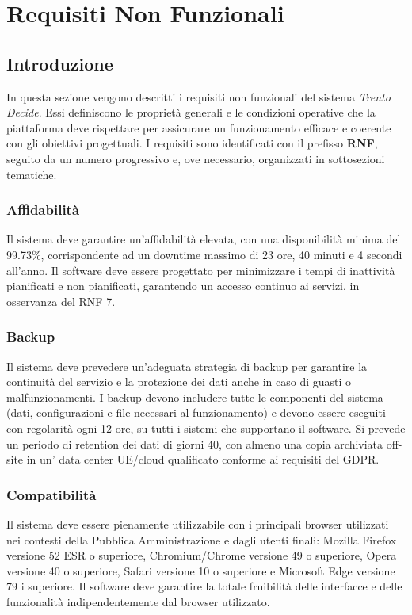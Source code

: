 \setcounter{secnumdepth}{3}

\chapter{Requisiti Non Funzionali}

\renewcommand{\thesubsection}{RNF\arabic{subsection}}
\renewcommand{\thesubsubsection}{RNF\arabic{subsection}.\arabic{subsubsection}}

\setlength{\parskip}{0.4em}
\setlength{\parindent}{0pt}

\section{Introduzione}
In questa sezione vengono descritti i requisiti non funzionali del sistema \textit{Trento Decide}.
Essi definiscono le proprietà generali e le condizioni operative che la piattaforma deve rispettare per assicurare un funzionamento efficace e coerente con gli obiettivi progettuali.
I requisiti sono identificati con il prefisso \textbf{RNF}, seguito da un numero progressivo e, ove necessario, organizzati in sottosezioni tematiche.

\subsection{Affidabilità}
Il sistema deve garantire un'affidabilità elevata, con una disponibilità minima del 99.73{\%}, corrispondente ad un downtime massimo di 23 ore, 40 minuti e 4 secondi all'anno. Il software deve essere progettato per minimizzare i tempi di inattività pianificati e non pianificati, garantendo un accesso continuo ai servizi, in osservanza del RNF 7.

\subsection{Backup}
Il sistema deve prevedere un’adeguata strategia di backup per garantire la continuità del servizio e la protezione dei dati anche in caso di guasti o malfunzionamenti.
I backup devono includere tutte le componenti del sistema (dati, configurazioni e file necessari al funzionamento) e devono essere eseguiti con regolarità ogni 12 ore, su tutti i sistemi che supportano il software. Si prevede un periodo di retention dei dati di giorni 40, con almeno una copia archiviata off-site in un' data center UE/cloud qualificato conforme ai requisiti del GDPR.

\subsection{Compatibilità}
Il sistema deve essere pienamente utilizzabile con i principali browser utilizzati nei contesti della Pubblica Amministrazione e dagli utenti finali: Mozilla Firefox versione 52 ESR o superiore, Chromium/Chrome versione 49 o superiore, Opera versione 40 o superiore, Safari versione 10 o superiore e Microsoft Edge versione 79 i superiore. Il software deve garantire la totale fruibilità delle interfacce e delle funzionalità indipendentemente dal browser utilizzato.

